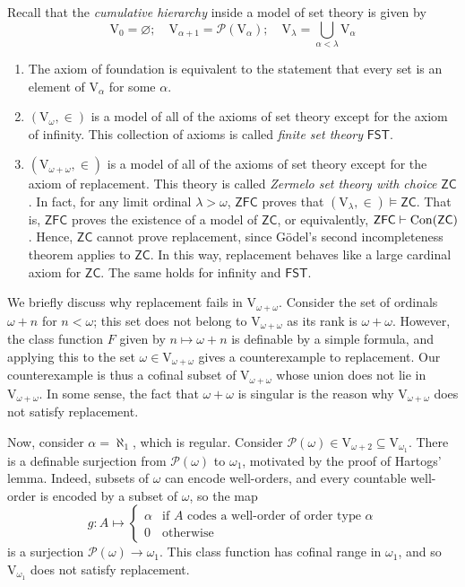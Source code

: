 Recall that the \emph{cumulative hierarchy} inside a model of set theory is given by
\[ \mathrm{V}_0 = \varnothing;\quad \mathrm{V}_{\alpha + 1} = \mathcal P(\mathrm{V}_\alpha);\quad \mathrm{V}_\lambda = \bigcup_{\alpha < \lambda} \mathrm{V}_\alpha \]
\begin{enumerate}
    \item The axiom of foundation is equivalent to the statement that every set is an element of \( \mathrm{V}_\alpha \) for some \( \alpha \).
    \item \( (\mathrm{V}_\omega, \in) \) is a model of all of the axioms of set theory except for the axiom of infinity.
    This collection of axioms is called \emph{finite set theory} \( \mathsf{FST} \).
    \item \( (\mathrm{V}_{\omega + \omega}, \in) \) is a model of all of the axioms of set theory except for the axiom of replacement.
    This theory is called \emph{Zermelo set theory with choice} \( \mathsf{ZC} \).
    In fact, for any limit ordinal \( \lambda > \omega \), \( \mathsf{ZFC} \) proves that \( (\mathrm{V}_\lambda, \in) \vDash \mathsf{ZC} \).
    That is, \( \mathsf{ZFC} \) proves the existence of a model of \( \mathsf{ZC} \), or equivalently, \( \mathsf{ZFC} \vdash \operatorname{Con}(\mathsf{ZC}) \).
    Hence, \( \mathsf{ZC} \) cannot prove replacement, since G\"odel's second incompleteness theorem applies to \( \mathsf{ZC} \).
    In this way, replacement behaves like a large cardinal axiom for \( \mathsf{ZC} \).
    The same holds for infinity and \( \mathsf{FST} \).
\end{enumerate}
We briefly discuss why replacement fails in \( \mathrm{V}_{\omega + \omega} \).
Consider the set of ordinals \( \omega + n \) for \( n < \omega \); this set does not belong to \( \mathrm{V}_{\omega + \omega} \) as its rank is \( \omega + \omega \).
However, the class function \( F \) given by \( n \mapsto \omega + n \) is definable by a simple formula, and applying this to the set \( \omega \in \mathrm{V}_{\omega + \omega} \) gives a counterexample to replacement.
Our counterexample is thus a cofinal subset of \( \mathrm{V}_{\omega + \omega} \) whose union does not lie in \( \mathrm{V}_{\omega + \omega} \).
In some sense, the fact that \( \omega + \omega \) is singular is the reason why \( \mathrm{V}_{\omega + \omega} \) does not satisfy replacement.

Now, consider \( \alpha = \aleph_1 \), which is regular.
Consider \( \mathcal P(\omega) \in \mathrm{V}_{\omega + 2} \subseteq \mathrm{V}_{\omega_1} \).
There is a definable surjection from \( \mathcal P(\omega) \) to \( \omega_1 \), motivated by the proof of Hartogs' lemma.
Indeed, subsets of \( \omega \) can encode well-orders, and every countable well-order is encoded by a subset of \( \omega \), so the map
\[ g : A \mapsto \begin{cases}
    \alpha & \text{if } A \text{ codes a well-order of order type } \alpha \\
    0 & \text{otherwise}
\end{cases} \]
is a surjection \( \mathcal P(\omega) \to \omega_1 \).
This class function has cofinal range in \( \omega_1 \), and so \( \mathrm{V}_{\omega_1} \) does not satisfy replacement.

